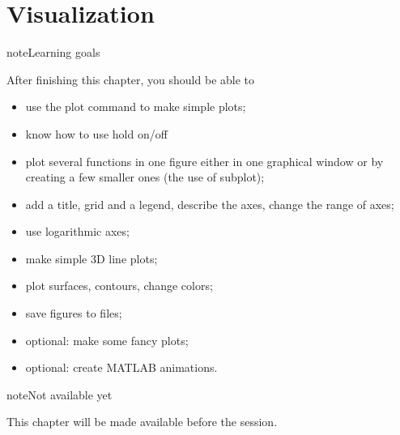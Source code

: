 \documentclass[letterpaper,10pt,english]{jupyterBook}
\begin{document}
\chapter{Visualization}
\label{\detokenize{placeholder_notebooks/6_Visualization/6_Visualization_student:visualization}}\label{\detokenize{placeholder_notebooks/6_Visualization/6_Visualization_student::doc}}
\begin{sphinxadmonition}{note}{Learning goals}

\sphinxAtStartPar
After finishing this chapter, you should be able to
\begin{itemize}
\item {} 
\sphinxAtStartPar
use the plot command to make simple plots;

\item {} 
\sphinxAtStartPar
know how to use hold on/off

\item {} 
\sphinxAtStartPar
plot several functions in one figure either in one graphical window or by creating a few smaller ones (the use of subplot);

\item {} 
\sphinxAtStartPar
add a title, grid and a legend, describe the axes, change the range of axes;

\item {} 
\sphinxAtStartPar
use logarithmic axes;

\item {} 
\sphinxAtStartPar
make simple 3D line plots;

\item {} 
\sphinxAtStartPar
plot surfaces, contours, change colors;

\item {} 
\sphinxAtStartPar
save figures to files;

\item {} 
\sphinxAtStartPar
optional: make some fancy plots;

\item {} 
\sphinxAtStartPar
optional: create MATLAB animations.

\end{itemize}
\end{sphinxadmonition}

\begin{sphinxadmonition}{note}{Not available yet}

\sphinxAtStartPar
This chapter will be made available before the session.
\end{sphinxadmonition}
\end{document}
